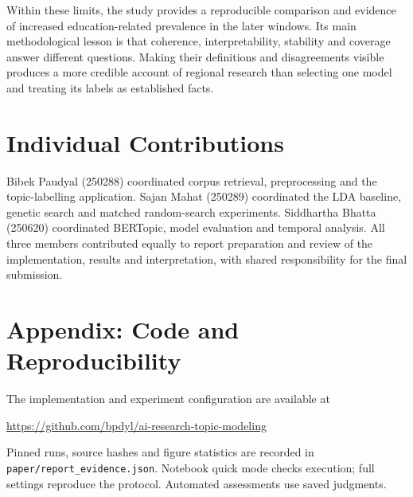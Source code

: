 Within these limits, the study provides a reproducible comparison and evidence of increased
education-related prevalence in the later windows. Its main methodological lesson is that
coherence, interpretability, stability and coverage answer different questions. Making their
definitions and disagreements visible produces a more credible account of regional research
than selecting one model and treating its labels as established facts.

\balance
\section*{Individual Contributions}
Bibek Paudyal (250288) coordinated corpus retrieval, preprocessing and the topic-labelling
application. Sajan Mahat (250289) coordinated the LDA baseline, genetic search and matched
random-search experiments. Siddhartha Bhatta (250620) coordinated BERTopic, model evaluation
and temporal analysis. All three members contributed equally to report preparation and
review of the implementation, results and interpretation, with shared responsibility for
the final submission.



\section*{Appendix: Code and Reproducibility}
The implementation and experiment configuration are available at
\begin{center}
\small\url{https://github.com/bpdyl/ai-research-topic-modeling}
\end{center}
\noindent Pinned runs, source hashes and figure statistics are recorded in
\texttt{paper/report\_evidence.json}. Notebook quick mode checks execution; full settings
reproduce the protocol. Automated assessments use saved judgments.
